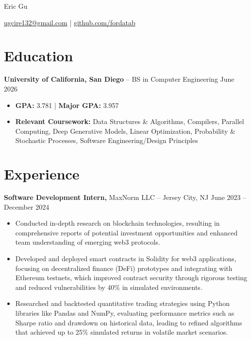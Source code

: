 \documentclass[11pt]{article}       %
\begin{document}
\centerline{\Huge Eric Gu}

\vspace{-4pt}

\centerline{\href{mailto:ugcire132@gmail.com}{ugcire132@gmail.com} |  \href{github.com/fordatab}{github.com/fordatab}}

\vspace{-18.5pt}

\section*{Education}
\textbf{University of California, San Diego} -- BS in Computer Engineering  \hfill June 2026\begin{itemize}[leftmargin=*, nosep]
    \item \textbf{GPA:} 3.781 | \textbf{Major GPA:} 3.957
    \item \textbf{Relevant Coursework:} Data Structures \& Algorithms, Compilers, Parallel Computing, Deep Generative Models, Linear Optimization, Probability \& Stochastic Processes, Software Engineering/Design Principles
\end{itemize}


\vspace{-18.5pt}

\section*{Experience}
\textbf{Software Development Intern,} {MaxNorm LLC} -- Jersey City, NJ \hfill June 2023 -- December 2024 \
\vspace{-9pt}
\begin{itemize}
\item Conducted in-depth research on blockchain technologies, resulting in comprehensive reports of potential investment opportunities and enhanced team understanding of emerging web3 protocols.
\item Developed and deployed smart contracts in Solidity for web3 applications, focusing on decentralized finance (DeFi) prototypes and integrating with Ethereum testnets, which improved contract security through rigorous testing and reduced vulnerabilities by 40\% in simulated environments.
\item Researched and backtested quantitative trading strategies using Python libraries like Pandas and NumPy, evaluating performance metrics such as Sharpe ratio and drawdown on historical data, leading to refined algorithms that achieved up to 25\% simulated returns in volatile market scenarios.
\end{itemize}
\end{document}
